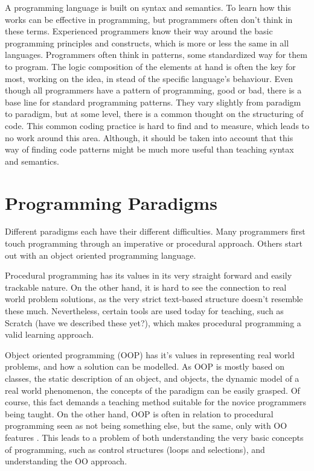 A programming language is built on syntax and semantics. To learn how this works can be effective in programming, but programmers often don't think in these terms. Experienced programmers know their way around the basic programming principles and constructs, which is more or less the same in all languages. Programmers often think in patterns, some standardized way for them to program. The logic composition of the elements at hand is often the key for most, working on the idea, in stead of the specific language's behaviour. Even though all programmers have a pattern of programming, good or bad, there is a base line for standard programming patterns. They vary slightly from paradigm to paradigm, but at some level, there is a common thought on the structuring of code. This common coding practice is hard to find and to measure, which leads to no  work around this area. Although, it should be taken into account that this way of finding code patterns might be much more useful than teaching syntax and semantics.


\section{Programming Paradigms}
Different paradigms each have their different difficulties. Many programmers first touch programming through an imperative or procedural approach. Others start out with an object oriented programming language. 

Procedural programming has its values in its very straight forward and easily trackable nature. On the other hand, it is hard to see the connection to real world problem solutions, as the very strict text-based structure doesn't resemble these much. Nevertheless, certain tools are used today for teaching, such as Scratch (have we described these yet?), which makes procedural programming a valid learning approach.

Object oriented programming (OOP) has it's values in representing real world problems, and how a solution can be modelled. As OOP is mostly based on classes, the static description of an object, and objects, the dynamic model of a real world phenomenon, the concepts of the paradigm can be easily grasped. Of course, this fact demands a teaching method suitable for the novice programmers being taught. On the other hand, OOP is often in relation to procedural programming seen as not being something else, but the same, only with OO features \cite{Garner05}. This leads to a problem of both understanding the very basic concepts of programming, such as control structures (loops and selections), and understanding the OO approach.

